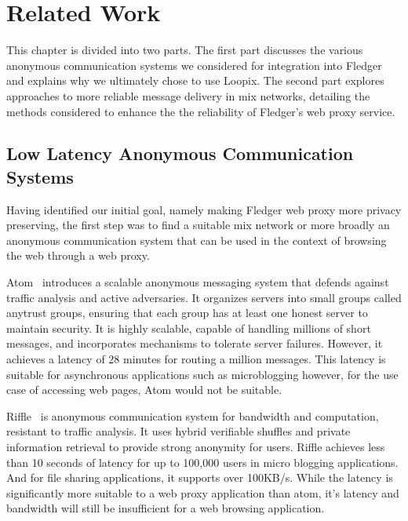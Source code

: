 \documentclass[a4paper,11pt,oneside]{report}
\begin{document}
\chapter{Related Work}



This chapter is divided into two parts. The first part discusses the various anonymous communication systems we considered for integration into Fledger and explains why we ultimately chose to use Loopix. The second part explores approaches to more reliable message delivery in mix networks, detailing the methods considered to enhance the the reliability of Fledger's web proxy service.
\section{Low Latency Anonymous Communication Systems}
\label{sec:mixers}
Having identified our initial goal, namely making Fledger web proxy more privacy preserving, the first step was to find a suitable mix network or more broadly an anonymous communication system that can be used in the context of browsing the web through a web proxy. 

Atom~\cite{atom} introduces a scalable anonymous messaging system that defends against traffic analysis and active adversaries. It organizes servers into small groups called anytrust groups, ensuring that each group has at least one honest server to maintain security. It is highly scalable, capable of handling millions of short messages, and incorporates mechanisms to tolerate server failures. However, it achieves a latency of 28 minutes for routing a million messages. This latency is suitable for asynchronous applications such as microblogging however, for the use case of accessing web pages, Atom would not be suitable.

Riffle~\cite{Riffle} is anonymous communication system for bandwidth and computation, resistant to traffic analysis. It uses hybrid verifiable shuffles and private information retrieval to provide strong anonymity for users. Riffle achieves less than 10 seconds of latency for up to 100,000 users in micro blogging applications. And for file sharing applications, it supports over 100KB/s. While the latency is significantly more suitable to a web proxy application than atom, it's latency and bandwidth will still be insufficient for a web browsing application.
\end{document}

